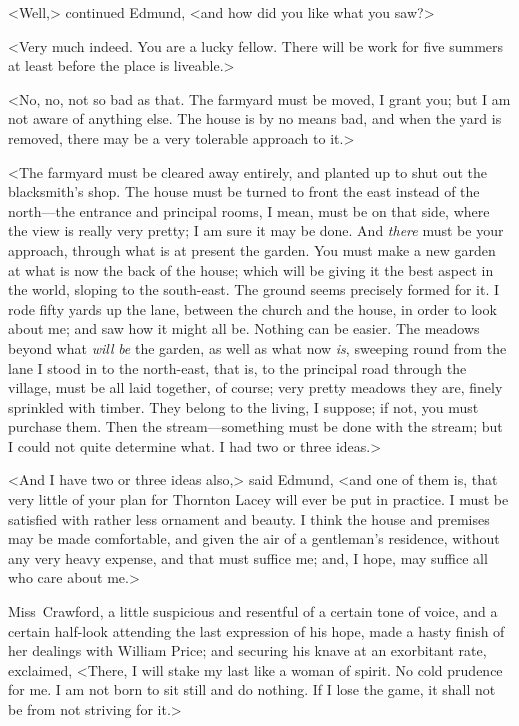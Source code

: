 <Well,> continued Edmund, <and how did you like what you saw?>

<Very much indeed. You are a lucky fellow. There will be work for five summers at least before the place is liveable.>

<No, no, not so bad as that. The farmyard must be moved, I grant you; but I am not aware of anything else. The house is by no means bad, and when the yard is removed, there may be a very tolerable approach to it.>

<The farmyard must be cleared away entirely, and planted up to shut out the blacksmith's shop. The house must be turned to front the east instead of the north—the entrance and principal rooms, I mean, must be on that side, where the view is really very pretty; I am sure it may be done. And \textit{there}  must be your approach, through what is at present the garden. You must make a new garden at what is now the back of the house; which will be giving it the best aspect in the world, sloping to the south-east. The ground seems precisely formed for it. I rode fifty yards up the lane, between the church and the house, in order to look about me; and saw how it might all be. Nothing can be easier. The meadows beyond what \textit{will}  \textit{be}  the garden, as well as what now \textit{is}, sweeping round from the lane I stood in to the north-east, that is, to the principal road through the village, must be all laid together, of course; very pretty meadows they are, finely sprinkled with timber. They belong to the living, I suppose; if not, you must purchase them. Then the stream—something must be done with the stream; but I could not quite determine what. I had two or three ideas.>

<And I have two or three ideas also,> said Edmund, <and one of them is, that very little of your plan for Thornton Lacey will ever be put in practice. I must be satisfied with rather less ornament and beauty. I think the house and premises may be made comfortable, and given the air of a gentleman's residence, without any very heavy expense, and that must suffice me; and, I hope, may suffice all who care about me.>

Miss~Crawford, a little suspicious and resentful of a certain tone of voice, and a certain half-look attending the last expression of his hope, made a hasty finish of her dealings with William Price; and securing his knave at an exorbitant rate, exclaimed, <There, I will stake my last like a woman of spirit. No cold prudence for me. I am not born to sit still and do nothing. If I lose the game, it shall not be from not striving for it.>

